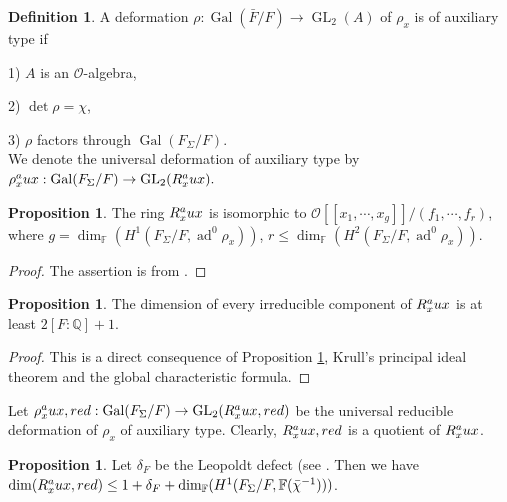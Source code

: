 \documentclass[12pt]{amsart}
\theoremstyle{plain}
\theoremstyle{definition}
\newtheorem{defn}[thm]{Definition}
\newtheorem{prop}[thm]{Proposition}
\theoremstyle{remark}
\begin{document}
\begin{defn}\label{auxiliary}
	A deformation $\rho: \operatorname{Gal}(\bar{F}/F) \to \operatorname{GL}_2(A)$ of $ \rho_x$ is of auxiliary type if
	
	1) $A$ is an $\mathcal{O}$-algebra,
	
	2) $\operatorname{det} \rho = \chi$,
	
	3) $\rho$ factors through $\operatorname{Gal}(F_{\Sigma}/F)$.
	\\
	We denote the universal deformation of auxiliary type by $
	\rho_x^\textnormal{aux}: \operatorname{Gal}(F_{\Sigma}/F) \to \operatorname{GL}_2(R_x^\textnormal{aux}).$
\end{defn}

\begin{prop} \label{dimension}  The ring  $R_x^\textnormal{aux}$ is isomorphic to $\mathcal{O}[[x_1,\cdots, x_g]]/(f_1,\cdots, f_r)$, where $g= \operatorname{dim}_{\mathbb{F}} (H^1(F_{\Sigma}/F, \operatorname{ad}^0 \rho_x))$, $ r \le \operatorname{dim}_{\mathbb{F}} (H^2(F_{\Sigma}/F, \operatorname{ad}^0 \rho_x))$.
	
	 
\end{prop}

\begin{proof}
	The assertion is from \cite[Proposition 2]{mazur1989deforming}. 
\end{proof}
 
 \begin{prop}\label{raux}
 	The dimension of every irreducible component of $R_x^\textnormal{aux} $ is at least $2[F: \mathbb{Q}]+1$.
 \end{prop}
 
 \begin{proof}
 	This is a direct consequence of Proposition \ref{dimension}, Krull's principal ideal theorem and the global characteristic formula.
 \end{proof}
 
 Let $\rho_x^\textnormal{aux,red}: \operatorname{Gal}(F_{\Sigma}/F) \to \operatorname{GL}_2(R_x^\textnormal{aux,red})$ be the universal reducible deformation of $\rho_x$ of auxiliary type. Clearly, $R_x^\textnormal{aux,red} $ is a quotient of $R_x^\textnormal{aux} $.
 
 \begin{prop} \label{red} Let $\delta_F$ be the Leopoldt defect (see \cite[10.3.7]{neukirch2013cohomology}. Then we have $\operatorname{dim} (R_x^\textnormal{aux,red}) \le 1+\delta_F +\operatorname{dim}_{\mathbb{F}}(H^1(F_{\Sigma}/F, \mathbb{F}(\bar{\chi}^{-1})))$.
 	
 \end{prop}
 
\end{document}
